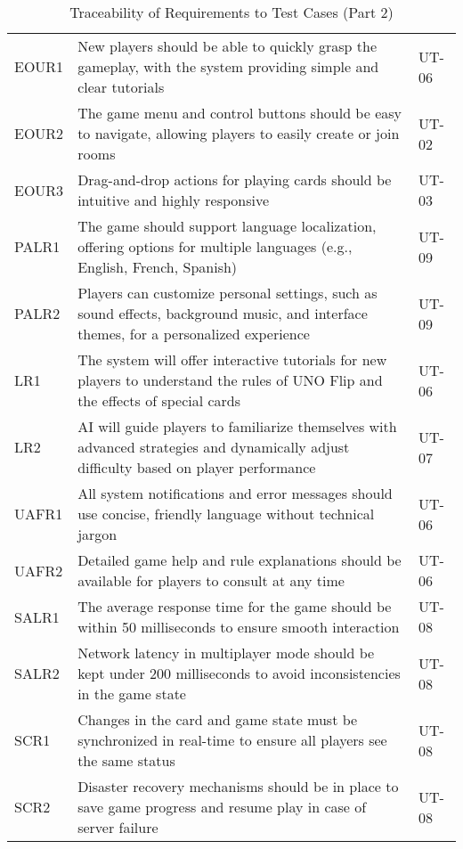 \documentclass[12pt, titlepage]{article}
\begin{document}
\begin{table}[H]
    \centering
    \begin{tabularx}{\textwidth}{|l|X|l|}
        \hline
        EOUR1 & New players should be able to quickly grasp the gameplay, with the system providing simple and clear tutorials & UT-06 \\
        EOUR2 & The game menu and control buttons should be easy to navigate, allowing players to easily create or join rooms & UT-02 \\
        EOUR3 & Drag-and-drop actions for playing cards should be intuitive and highly responsive & UT-03 \\
        PALR1 & The game should support language localization, offering options for multiple languages (e.g., English, French, Spanish) & UT-09 \\
        PALR2 & Players can customize personal settings, such as sound effects, background music, and interface themes, for a personalized experience & UT-09 \\
        LR1 & The system will offer interactive tutorials for new players to understand the rules of UNO Flip and the effects of special cards & UT-06 \\
        LR2 & AI will guide players to familiarize themselves with advanced strategies and dynamically adjust difficulty based on player performance & UT-07 \\
        UAFR1 & All system notifications and error messages should use concise, friendly language without technical jargon & UT-06 \\
        UAFR2 & Detailed game help and rule explanations should be available for players to consult at any time & UT-06 \\
        SALR1 & The average response time for the game should be within 50 milliseconds to ensure smooth interaction & UT-08 \\
        SALR2 & Network latency in multiplayer mode should be kept under 200 milliseconds to avoid inconsistencies in the game state & UT-08 \\
        SCR1 & Changes in the card and game state must be synchronized in real-time to ensure all players see the same status & UT-08 \\
        SCR2 & Disaster recovery mechanisms should be in place to save game progress and resume play in case of server failure & UT-08 \\
        \hline
    \end{tabularx}
    \caption{Traceability of Requirements to Test Cases (Part 2)}
    \label{tab:trace_requirements_2}
\end{table}
\end{document}
